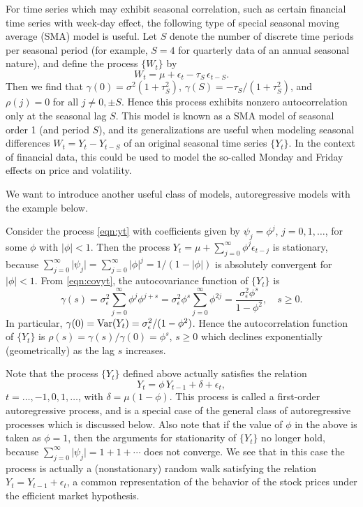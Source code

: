 \begin{ex} \label{ex:seasonal} 
For time series which may exhibit seasonal correlation, such as certain financial time series with week-day effect, the following type of special seasonal moving average (SMA) model is useful. Let $S$ denote the number of discrete time periods per seasonal period (for example, $S= 4$ for quarterly data of an annual seasonal nature), and define the process $\{ W_t \}$ by
	\[	
	W_t = \mu + \epsilon_t - \tau_S \, \epsilon_{t-S}.
	\]
Then we find that $\gamma(0)= \sigma^2 (1+\tau_S^2)$, $\gamma(S) = - \tau_S / (1+\tau_S^2)$,  and $\rho(j)= 0$ for all $j \neq 0, \pm S$. Hence this process exhibits nonzero autocorrelation only at the seasonal lag $S$. This model is known as a SMA model of seasonal order 1 (and period $S$), and its generalizations are useful when modeling seasonal differences $W_t = Y_t - Y_{t-S}$ of an original seasonal time series $\{ Y_t \}$.  In the context of financial data, this could be used to model the so-called Monday and Friday effects on price and volatility. \xqed
\end{ex}      


We want to introduce another useful class of models, autoregressive models with the example below.


\begin{ex} \label{ex:autoregor1}
Consider the process \eqref{eqn:yt} with coefficients given by $\psi_j = \phi^j$, $j= 0,1,\ldots$,  for some $\phi$ with $\lvert \phi \rvert < 1$. Then the process $Y_t = \mu + \sum_{j=0}^{\infty} \phi^j \epsilon_{t-j}$ is stationary, because $\sum_{j=0}^{\infty} \lvert \psi_j \rvert= \sum_{j=0}^{\infty} \lvert \phi \rvert^j = 1/(1 - \lvert \phi \rvert)$ is absolutely convergent for $\lvert \phi \rvert < 1$. From \eqref{eqn:covyt}, the autocovariance function of $\{ Y_t \}$ is
	\[
	\gamma(s)= \sigma^2_{\epsilon} \sum_{j=0}^{\infty} \phi^j \phi^{j+s}= \sigma^2_{\epsilon} \phi^s \sum_{j=0}^{\infty} \phi^{2j}= \frac{\sigma^2_{\epsilon} \phi^s}{1 - \phi^2}, \quad s \geq 0.
	\]
In particular, $\gamma(0) = \operatorname{Var}(Y_t) = \sigma^2_{\epsilon}/(1-\phi^2)$. Hence the autocorrelation function of $\{ Y_t \}$ is $\rho(s)= \gamma(s) / \gamma(0)= \phi^s$, $ s \geq 0$ which declines exponentially (geometrically) as the lag $s$ increases.


Note that the process $\{Y_t\}$ defined above actually satisfies the relation 
	\[
	Y_t= \phi \, Y_{t-1} + \delta+\epsilon_t,
	\]
$t= \ldots ,-1, 0, 1, \ldots$, with $\delta = \mu(1 - \phi)$. This process is called a first-order autoregressive process, and is a special case of the general class of autoregressive processes which is discussed below. Also note that if the value of $\phi$ in the above is taken as  $\phi = 1$, then the arguments for stationarity of $\{Y_t\}$ no longer hold, because $\sum_{j=0}^{\infty} \lvert \psi_j \rvert = 1 + 1 + \cdots$ does not converge. We see that in this case the process is actually a (nonstationary) random walk satisfying the relation  $Y_t = Y_{t-1} + \epsilon_t$, a common representation of the behavior of the stock prices under the efficient market hypothesis. \xqed
\end{ex}



